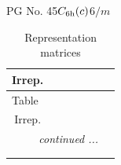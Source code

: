 \documentclass[fleqn,8pt,landscape]{jsarticle}
\begin{document}
\setcounter{MaxMatrixCols}{32}

\renewcommand{\tablename}{Table~}
\renewcommand{\figurename}{Figure~}
\begin{center}
\LARGE
PG No. 45\quad$C_{\rm 6h}(c)$\quad$6/m$\quad[ hexagonal ]
\end{center}
\renewcommand{\arraystretch}{1.2}
\begin{longtable}{ccccccc}
\caption{Representation matrices}
 \\
 \hline \hline
Irrep. &  &  &  &  &  &  \\ \hline \endfirsthead

\multicolumn{6}{l}{\tablename\ \thetable{}} \\
 \hline \hline
Irrep. &  &  &  &  &  &  \\ \hline \endhead

 \hline \hline
\multicolumn{6}{r}{\footnotesize\it continued ...} \\ \endfoot

 \hline \hline
\multicolumn{6}{r}{} \\ \endlastfoot


\end{longtable}
\end{document}

